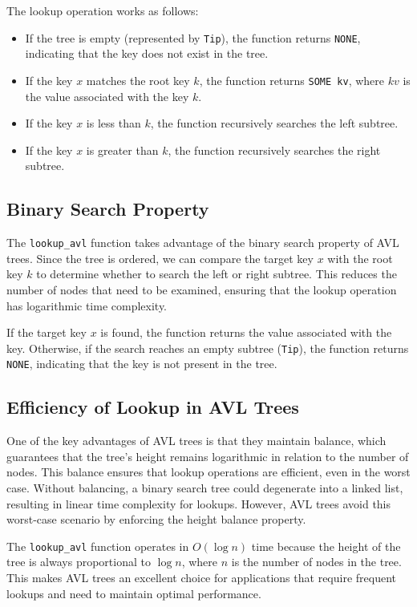 \documentclass[12pt]{article}
\begin{document}
\begin{itemize}
The lookup operation works as follows:
\begin{itemize}
    \item If the tree is empty (represented by \texttt{Tip}), the function returns \texttt{NONE}, indicating that the key does not exist in the tree.
    \item If the key \( x \) matches the root key \( k \), the function returns \texttt{SOME kv}, where \( kv \) is the value associated with the key \( k \).
    \item If the key \( x \) is less than \( k \), the function recursively searches the left subtree.
    \item If the key \( x \) is greater than \( k \), the function recursively searches the right subtree.
\end{itemize}

\subsection*{Binary Search Property}

The \texttt{lookup\_avl} function takes advantage of the binary search property of AVL trees. Since the tree is ordered, we can compare the target key \( x \) with the root key \( k \) to determine whether to search the left or right subtree. This reduces the number of nodes that need to be examined, ensuring that the lookup operation has logarithmic time complexity.

If the target key \( x \) is found, the function returns the value associated with the key. Otherwise, if the search reaches an empty subtree (\texttt{Tip}), the function returns \texttt{NONE}, indicating that the key is not present in the tree.

\subsection*{Efficiency of Lookup in AVL Trees}

One of the key advantages of AVL trees is that they maintain balance, which guarantees that the tree's height remains logarithmic in relation to the number of nodes. This balance ensures that lookup operations are efficient, even in the worst case. Without balancing, a binary search tree could degenerate into a linked list, resulting in linear time complexity for lookups. However, AVL trees avoid this worst-case scenario by enforcing the height balance property.

The \texttt{lookup\_avl} function operates in \( O(\log n) \) time because the height of the tree is always proportional to \( \log n \), where \( n \) is the number of nodes in the tree. This makes AVL trees an excellent choice for applications that require frequent lookups and need to maintain optimal performance.


\end{itemize}
\end{document}
